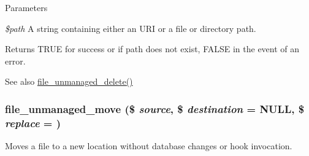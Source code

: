 \begin{DoxyParams}{Parameters}
\item[{\em \$path}]A string containing either an URI or a file or directory path.\end{DoxyParams}
\begin{DoxyReturn}{Returns}
TRUE for success or if path does not exist, FALSE in the event of an error.
\end{DoxyReturn}
\begin{DoxySeeAlso}{See also}
\hyperlink{group__file_ga336a7e83da1397131e665d1c6e97fc83}{file\_\-unmanaged\_\-delete()} 
\end{DoxySeeAlso}
\hypertarget{group__file_ga3fd3a919ca321ec8c5bd1e4b069237a1}{
\subsubsection[{file\_\-unmanaged\_\-move}]{\setlength{\rightskip}{0pt plus 5cm}file\_\-unmanaged\_\-move (\$ {\em source}, \/  \$ {\em destination} = {\ttfamily NULL}, \/  \$ {\em replace} = {})}}
\label{group__file_ga3fd3a919ca321ec8c5bd1e4b069237a1}
Moves a file to a new location without database changes or hook invocation.


